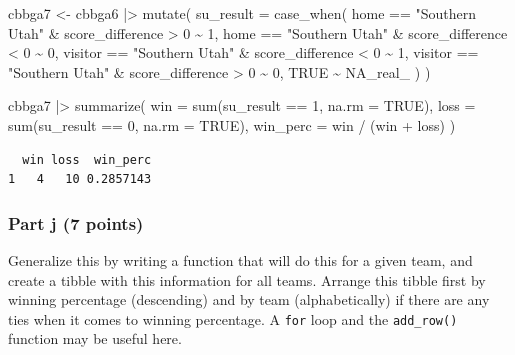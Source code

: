 \documentclass[
  letterpaper,
  DIV=11,
  numbers=noendperiod]{scrartcl}
\newenvironment{Shaded}{\begin{snugshade}}{\end{snugshade}}
\newcommand{\AttributeTok}[1]{\textcolor[rgb]{0.40,0.45,0.13}{#1}}
\newcommand{\ConstantTok}[1]{\textcolor[rgb]{0.56,0.35,0.01}{#1}}
\newcommand{\DecValTok}[1]{\textcolor[rgb]{0.68,0.00,0.00}{#1}}
\newcommand{\FunctionTok}[1]{\textcolor[rgb]{0.28,0.35,0.67}{#1}}
\newcommand{\NormalTok}[1]{\textcolor[rgb]{0.00,0.23,0.31}{#1}}
\newcommand{\OtherTok}[1]{\textcolor[rgb]{0.00,0.23,0.31}{#1}}
\newcommand{\SpecialCharTok}[1]{\textcolor[rgb]{0.37,0.37,0.37}{#1}}
\newcommand{\StringTok}[1]{\textcolor[rgb]{0.13,0.47,0.30}{#1}}
\begin{document}
\begin{Shaded}
\begin{Highlighting}[]
\NormalTok{cbbga7 }\OtherTok{\textless{}{-}}\NormalTok{ cbbga6 }\SpecialCharTok{|\textgreater{}}
  \FunctionTok{mutate}\NormalTok{(}
    \AttributeTok{su\_result =} \FunctionTok{case\_when}\NormalTok{(}
\NormalTok{      home }\SpecialCharTok{==} \StringTok{"Southern Utah"} \SpecialCharTok{\&}\NormalTok{ score\_difference }\SpecialCharTok{\textgreater{}} \DecValTok{0} \SpecialCharTok{\textasciitilde{}} \DecValTok{1}\NormalTok{,}
\NormalTok{      home }\SpecialCharTok{==} \StringTok{"Southern Utah"} \SpecialCharTok{\&}\NormalTok{ score\_difference }\SpecialCharTok{\textless{}} \DecValTok{0} \SpecialCharTok{\textasciitilde{}} \DecValTok{0}\NormalTok{,}
\NormalTok{      visitor }\SpecialCharTok{==} \StringTok{"Southern Utah"} \SpecialCharTok{\&}\NormalTok{ score\_difference }\SpecialCharTok{\textless{}} \DecValTok{0} \SpecialCharTok{\textasciitilde{}} \DecValTok{1}\NormalTok{,}
\NormalTok{      visitor }\SpecialCharTok{==} \StringTok{"Southern Utah"} \SpecialCharTok{\&}\NormalTok{ score\_difference }\SpecialCharTok{\textgreater{}} \DecValTok{0} \SpecialCharTok{\textasciitilde{}} \DecValTok{0}\NormalTok{,}
      \ConstantTok{TRUE} \SpecialCharTok{\textasciitilde{}} \ConstantTok{NA\_real\_}
\NormalTok{    )}
\NormalTok{  )}

\NormalTok{cbbga7 }\SpecialCharTok{|\textgreater{}}
  \FunctionTok{summarize}\NormalTok{(}
    \AttributeTok{win =} \FunctionTok{sum}\NormalTok{(su\_result }\SpecialCharTok{==} \DecValTok{1}\NormalTok{, }\AttributeTok{na.rm =} \ConstantTok{TRUE}\NormalTok{),}
    \AttributeTok{loss =} \FunctionTok{sum}\NormalTok{(su\_result }\SpecialCharTok{==} \DecValTok{0}\NormalTok{, }\AttributeTok{na.rm =} \ConstantTok{TRUE}\NormalTok{),}
    \AttributeTok{win\_perc =}\NormalTok{ win }\SpecialCharTok{/}\NormalTok{ (win }\SpecialCharTok{+}\NormalTok{ loss)}
\NormalTok{  )}
\end{Highlighting}
\end{Shaded}

\begin{verbatim}
  win loss  win_perc
1   4   10 0.2857143
\end{verbatim}

\subsubsection{Part j (7 points)}\label{part-j-7-points}

Generalize this by writing a function that will do this for a given
team, and create a tibble with this information for all teams. Arrange
this tibble first by winning percentage (descending) and by team
(alphabetically) if there are any ties when it comes to winning
percentage. A \texttt{for} loop and the \texttt{add\_row()} function may
be useful here.
\end{document}
